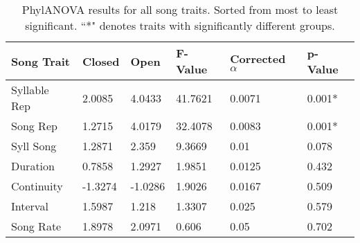 \documentclass[a4paper,12pt]{article}
\begin{document}
\newcommand{\beginsupplement}{%
        \setcounter{table}{0}
        \renewcommand{\thetable}{S\arabic{table}}%
        \setcounter{figure}{0}
        \renewcommand{\thefigure}{S\arabic{figure}}%
     }

    
\begin{table}[ht]
\caption{PhylANOVA results for all song traits.  Sorted from most to least significant.  ``*" denotes traits with significantly different groups.}
\centering
\begin{tabular}{llllll}
  \hline
Song Trait & Closed & Open & F-Value & Corrected $\alpha$ & p-Value \\ 
  \hline
Syllable Rep & 2.0085 & 4.0433 & 41.7621 & 0.0071 & 0.001* \\ 
  Song Rep & 1.2715 & 4.0179 & 32.4078 & 0.0083 & 0.001* \\ 
  Syll Song & 1.2871 & 2.359 & 9.3669 & 0.01 & 0.078 \\ 
  Duration & 0.7858 & 1.2927 & 1.9851 & 0.0125 & 0.432 \\ 
  Continuity & -1.3274 & -1.0286 & 1.9026 & 0.0167 & 0.509 \\ 
  Interval & 1.5987 & 1.218 & 1.3307 & 0.025 & 0.579 \\ 
  Song Rate & 1.8978 & 2.0971 & 0.606 & 0.05 & 0.702 \\ 
   \hline
\end{tabular}
\end{table}

\beginsupplement
\end{document}
